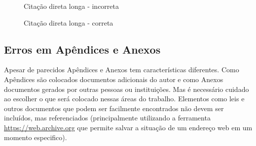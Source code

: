 \begin{figure}[hbt]
    \centering
    \caption{Citação direta longa - incorreta}
    \label{fig_citacao_longa_errada}
\end{figure}

\begin{figure}[htb]
    \centering
    \caption{Citação direta longa - correta}
    \label{fig_citacao_longa_certa}
\end{figure}


\subsection{Erros em Apêndices e Anexos}
\label{erros-apendices-e-anexos}

Apesar de parecidos Apêndices e Anexos tem características diferentes. Como Apêndices são colocados documentos adicionais do autor e como Anexos documentos gerados por outras pessoas ou instituições. Mas é necessário cuidado ao escolher o que será colocado nessas áreas do trabalho. Elementos como leis e outros documentos que podem ser facilmente encontrados não devem ser incluídos, mas referenciados (principalmente utilizando a ferramenta \url{https://web.archive.org} que permite salvar a situação de um endereço web em um momento especifico).  

